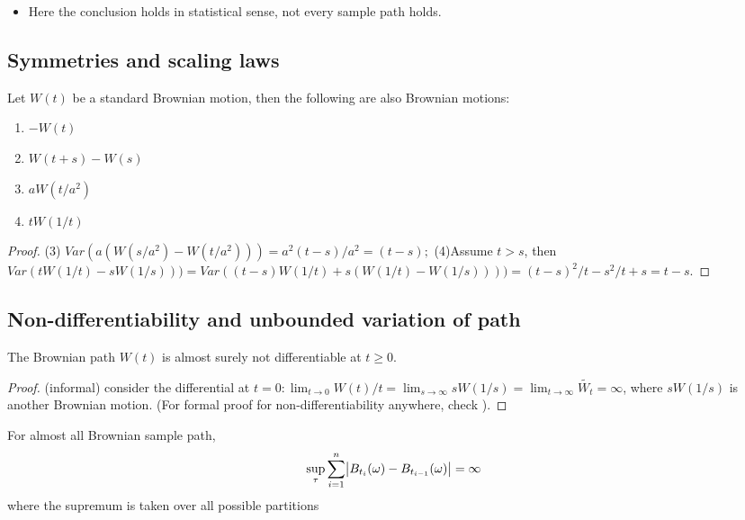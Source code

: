 \begin{refsection}
\begin{remark}[implications]\hfill
	\begin{itemize}
		\item Here the conclusion holds in statistical sense, not every sample path holds. 
	\end{itemize}
\end{remark}


\subsection{Symmetries and scaling laws}
\begin{lemma}
	Let $W(t)$ be a standard Brownian motion, then the following are also Brownian motions:
	\begin{enumerate}
		\item $-W(t)$
		\item $W(t+s)-W(s)$
		\item $aW(t/a^2)$
		\item $tW(1/t)$
	\end{enumerate}
\end{lemma}
\begin{proof}
	(3) $Var(a(W(s/a^2)-W(t/a^2)))=a^2(t-s)/a^2=(t-s);$ (4)Assume $t>s$, then $ Var(tW(1/t)-sW(1/s))) = Var((t-s)W(1/t)+s(W(1/t)-W(1/s))))=(t-s)^2/t-s^2/t+s=t-s$. 	
\end{proof}

\subsection{Non-differentiability and unbounded variation of path}
\begin{theorem}
	The Brownian path $W(t)$ is almost surely not differentiable at $t\geq 0$.
\end{theorem}
\begin{proof}
	(informal) consider the differential at $t=0:\lim_{t\to 0} W(t)/t = \lim_{s\to \infty} sW(1/s) = \lim_{t\to \infty} \tilde{W_t} = \infty$, where $sW(1/s)$ is another Brownian motion. (For formal proof for non-differentiability anywhere, check \cite{Holmes-Cerfon2015applied}).	
\end{proof}


\begin{theorem}
	\cite[189]{mikosch1998elementary} For almost all Brownian sample path, 
	$$\sup_{\tau} \sum_{i=1}^n \abs{B_{t_i}(\omega) - B_{t_{i-1}}(\omega)} = \infty$$
	where the supremum is taken over all possible partitions
\end{theorem}


\end{refsection}
